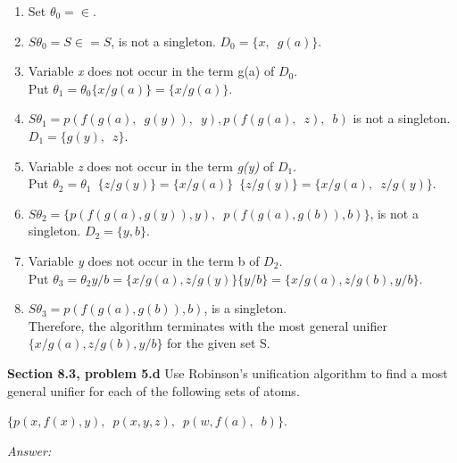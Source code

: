 \documentclass[12pt]{article}
\begin{document}
\begin{enumerate}
    \item Set $\theta_0 = \in$.
    \item $S\theta_0 = S \in = S$, is not a singleton. $D_0 = \{ x,\enspace g(a) \}$.
    \item Variable \emph{x} does not occur in the term g(a) of $D_0$. \\
          Put $\theta_1 = \theta_0 \{ x/ g(a)\} = \{ x/ g(a)\}$.
    \item $S\theta_1 = {p(f(g(a), \enspace g(y)), \enspace y), p(f(g(a), \enspace z), \enspace b)}$ 
          is not a singleton.$D_1 = \{ g(y), \enspace z \}$.  
    \item Variable \emph{z} does not occur in the term \emph{g(y)} of $D_1$. \\ 
          Put $\theta_2 = \theta_1 \enspace \{ z / g(y) \} = \{ x/g(a)\}\enspace \{z/g(y)\} = 
          \{x / g(a) ,\enspace z / g(y)\}$.
    \item $S\theta_2 = \{ p(f(g(a),g(y)),y),\enspace    
          p(f(g(a),g(b)),b)\}$, is not a singleton. $D_2 = \{y,b\}$.
    \item Variable \emph{y} does not occur in the term b of $D_2$. \\
          Put $\theta_3 = \theta_2{y/b} = \{x/g(a), z/g(y)\} \{y/b\} = \{ x/g(a), z/g(b), y/b\}$.
    \item $S\theta_3 = {p(f(g(a),g(b)), b)}$, is a singleton. \\
          Therefore, the algorithm terminates with the most general unifier $\{x/g(a), z/g(b), y/b\}$ 
          for the given set S.
\end{enumerate}

\textbf{Section 8.3, problem 5.d}   Use Robinson’s unification algorithm to find a most general 
unifier for each of the following sets of atoms.

$\{ p(x, f(x), y), \enspace p(x, y, z), \enspace p(w, f(a), \enspace b) \}$.

\emph{Answer:} 
\end{document}
